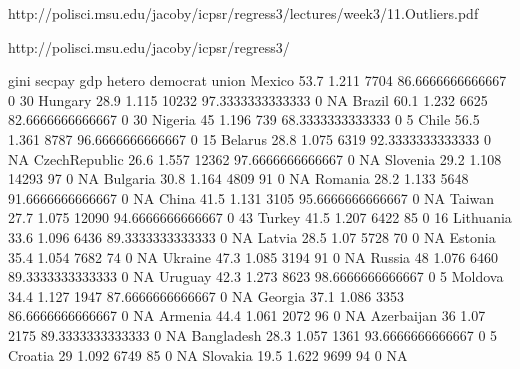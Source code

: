 http://polisci.msu.edu/jacoby/icpsr/regress3/lectures/week3/11.Outliers.pdf

http://polisci.msu.edu/jacoby/icpsr/regress3/

	gini	secpay  gdp  hetero	democrat    union
 Mexico       	53.7	1.211	7704	86.6666666666667	0	30
 Hungary      	28.9	1.115	10232	97.3333333333333	0	 NA
 Brazil       	60.1	1.232	6625	82.6666666666667	0	30
 Nigeria      	45	1.196	739	68.3333333333333	0	5
 Chile        	56.5	1.361	8787	96.6666666666667	0	15
 Belarus      	28.8	1.075	6319	92.3333333333333	0	 NA
 CzechRepublic	26.6	1.557	12362	97.6666666666667	0	 NA
 Slovenia     	29.2	1.108	14293	97			0	 NA
 Bulgaria     	30.8	1.164	4809	91			0	 NA
 Romania      	28.2	1.133	5648	91.6666666666667	0	 NA
 China        	41.5	1.131	3105	95.6666666666667	0	 NA
 Taiwan       	27.7	1.075	12090	94.6666666666667	0	43
 Turkey       	41.5	1.207	6422	85			0	16
 Lithuania    	33.6	1.096	6436	89.3333333333333	0	 NA
 Latvia       	28.5	1.07	5728	70			0	 NA
 Estonia      	35.4	1.054	7682	74			0	NA	 
 Ukraine      	47.3	1.085	3194	91			0	 NA
 Russia       	48	1.076	6460	89.3333333333333	0	 NA
 Uruguay      	42.3	1.273	8623	98.6666666666667	0	5
 Moldova      	34.4	1.127	1947	87.6666666666667	0	 NA
 Georgia      	37.1	1.086	3353	86.6666666666667	0	 NA
 Armenia      	44.4	1.061	2072	96			0	 NA
 Azerbaijan   	36	1.07	2175	89.3333333333333	0	 NA
 Bangladesh   	28.3	1.057	1361	93.6666666666667	0	5
 Croatia      	29	1.092	6749	85			0	NA 
 Slovakia     	19.5	1.622	9699	94			0	 NA
